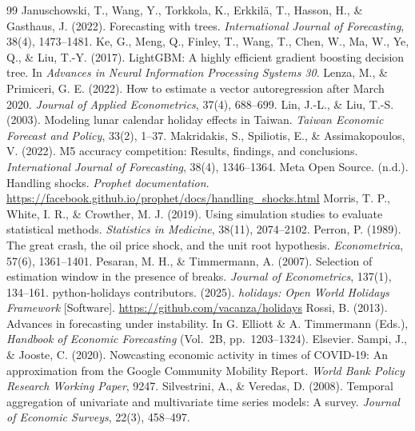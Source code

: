 \documentclass{article}
\theoremstyle{plain}
\theoremstyle{definition}
\theoremstyle{remark}
\begin{document}
\begin{thebibliography}{99}
 Januschowski, T., Wang, Y., Torkkola, K., Erkkilä, T., Hasson, H., \& Gasthaus, J. (2022). Forecasting with trees. \emph{International Journal of Forecasting}, 38(4), 1473--1481.
 Ke, G., Meng, Q., Finley, T., Wang, T., Chen, W., Ma, W., Ye, Q., \& Liu, T.-Y. (2017). LightGBM: A highly efficient gradient boosting decision tree. In \emph{Advances in Neural Information Processing Systems 30}.
 Lenza, M., \& Primiceri, G. E. (2022). How to estimate a vector autoregression after March 2020. \emph{Journal of Applied Econometrics}, 37(4), 688--699.
 Lin, J.-L., \& Liu, T.-S. (2003). Modeling lunar calendar holiday effects in Taiwan. \emph{Taiwan Economic Forecast and Policy}, 33(2), 1--37.
 Makridakis, S., Spiliotis, E., \& Assimakopoulos, V. (2022). M5 accuracy competition: Results, findings, and conclusions. \emph{International Journal of Forecasting}, 38(4), 1346--1364.
 Meta Open Source. (n.d.). Handling shocks. \emph{Prophet documentation}. \url{https://facebook.github.io/prophet/docs/handling_shocks.html}
 Morris, T. P., White, I. R., \& Crowther, M. J. (2019). Using simulation studies to evaluate statistical methods. \emph{Statistics in Medicine}, 38(11), 2074--2102.
 Perron, P. (1989). The great crash, the oil price shock, and the unit root hypothesis. \emph{Econometrica}, 57(6), 1361--1401.
 Pesaran, M. H., \& Timmermann, A. (2007). Selection of estimation window in the presence of breaks. \emph{Journal of Econometrics}, 137(1), 134--161.
 python-holidays contributors. (2025). \emph{holidays: Open World Holidays Framework} [Software]. \url{https://github.com/vacanza/holidays}
 Rossi, B. (2013). Advances in forecasting under instability. In G. Elliott \& A. Timmermann (Eds.), \emph{Handbook of Economic Forecasting} (Vol.\ 2B, pp.\ 1203--1324). Elsevier.
 Sampi, J., \& Jooste, C. (2020). Nowcasting economic activity in times of COVID-19: An approximation from the Google Community Mobility Report. \emph{World Bank Policy Research Working Paper}, 9247.
 Silvestrini, A., \& Veredas, D. (2008). Temporal aggregation of univariate and multivariate time series models: A survey. \emph{Journal of Economic Surveys}, 22(3), 458--497.

\end{thebibliography}
\end{document}
